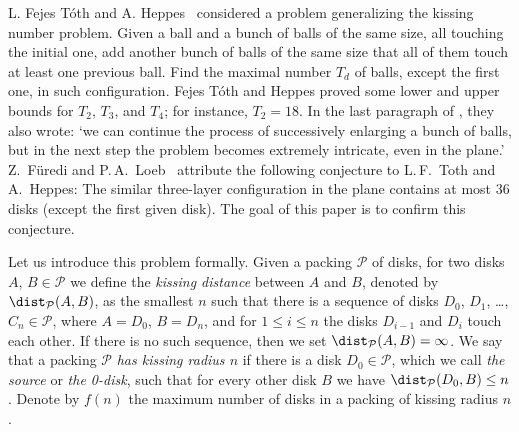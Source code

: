 L. Fejes T\'{o}th and A. Heppes~\cite{toth_heppes} considered a problem generalizing the kissing number problem. Given a ball and a bunch of balls of the same size, all touching the initial one, add another bunch of balls of the same size that all of them touch at least one previous ball. Find the maximal number $T_d$ of balls, except the first one, in such configuration. Fejes T\'{o}th and Heppes proved some lower and upper bounds for $T_2$, $T_3$, and $T_4$; for instance, $T_2 = 18$. In the last paragraph of \cite{toth_heppes}, they also wrote: `we can continue the process of
successively enlarging a bunch of balls, but in the next step the problem becomes extremely intricate, even in the plane.' %
Z.~F\"{u}redi and P.\,A.~Loeb~\cite{furedi} attribute the following conjecture to L.\,F.~Toth and A.~Heppes: The similar three-layer configuration in the plane contains at most $36$ disks (except the first given disk). The goal of this paper is to confirm this conjecture.

Let us introduce this problem formally. Given a packing $\mathcal{P}$ of disks, for two disks $A$, $B\in\mathcal{P}$ we define the \emph{kissing distance} between $A$ and $B$, denoted by $\dist_{\mathcal{P}}(A, B)$, as the smallest $n$ such that there is a sequence of disks $D_0$, $D_1$, \ldots, $C_n\in\mathcal{P}$, where $A = D_0$, $B = D_n$, and for $1\leq i\leq n$ the disks $D_{i-1}$ and $D_i$ touch each other. If there is no such sequence, then we set $\dist_{\mathcal{P}}(A, B) = \infty$. We say that a packing $\mathcal{P}$ \emph{has kissing radius $n$} if there is a disk $D_0\in\mathcal{P}$, which we call \emph{the source} or \emph{the 0-disk}, such that for every other disk $B$ we have $\dist_{\mathcal{P}}(D_0, B)\leq n$. Denote by $f(n)$ the maximum number of disks in a packing of kissing radius $n$.


